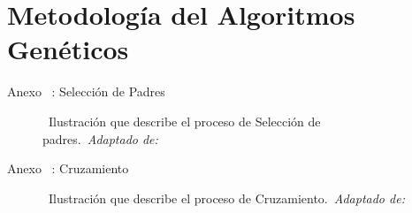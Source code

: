 \section{Metodología del Algoritmos Genéticos}

\begin{frame}{Anexo \thesection~: Selección de Padres}%
    \vspace{-0.15cm}
    \begin{figure}[H]
        \centering
        \vspace{-0.25cm}
        \caption{\tiny~Ilustración que describe el proceso de Selección de padres.~\textit{Adaptado de:}~\cite{ayoub2020}}%
        \label{fig:tournament_selection}
    \end{figure}
\end{frame}

\begin{frame}{Anexo \thesection~: Cruzamiento}%
    \vspace{-0.15cm}
    \begin{figure}[H]
        \centering
        \vspace{-0.25cm}
        \caption{\tiny~Ilustración que describe el proceso de Cruzamiento.~\textit{Adaptado de:}~\cite{stackoverflow_crossover_index_2019}}%
        \label{fig:tournament_selection}
    \end{figure}
\end{frame}

